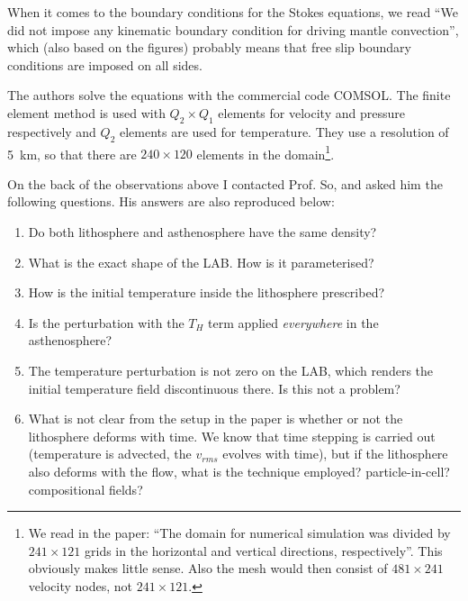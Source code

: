 When it comes to the boundary conditions for the Stokes equations, 
we read ``We did not impose any kinematic boundary condition for driving 
mantle convection'', which (also based on the figures) probably means 
that free slip boundary conditions are imposed on all sides.

The authors solve the equations with the commercial code COMSOL.
The finite element method is used with $Q_2\times Q_1$ elements for velocity and
pressure respectively and $Q_2$ elements are used for temperature.
They use a resolution of 5~\si{\km}, so that there are $240\times 120$ 
elements in the domain\footnote{We read in the paper: ``The domain for 
numerical simulation was divided by $241\times 121$ grids in the 
horizontal and vertical directions, respectively''.
This obviously makes little sense. Also the mesh would then consist of 
$481\times 241$ velocity nodes, not $241\times 121$.}.

\vspace{1cm}

On the back of the observations above I contacted Prof. So, and 
asked him the following questions. His answers are also reproduced below:
\begin{enumerate}
\item Do both lithosphere and asthenosphere have the same density?
\item What is the exact shape of the LAB. How is it parameterised?
\item How is the initial temperature inside the lithosphere prescribed?
\item Is the perturbation with the $T_H$ term applied {\it everywhere} in 
the asthenosphere? 
\item The temperature perturbation is not zero on the LAB, which renders the 
initial temperature field discontinuous there. Is this not a problem?
\item What is not clear from the setup in the paper is whether or not the lithosphere 
deforms with time. We know that time stepping is carried out (temperature is advected,
the $v_{rms}$ evolves with time), but if the lithosphere also deforms with the flow, 
what is the technique employed? particle-in-cell? compositional fields?
\end{enumerate} 








\newpage

